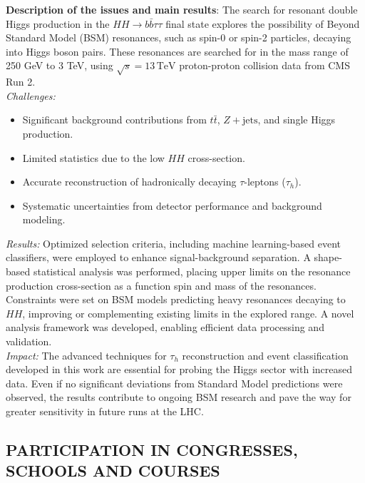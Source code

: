 \documentclass[12pt,a4paper,oneside]{extarticle}
\begin{document}
\noindent\textbf{Description of the issues and main results}:
The search for resonant double Higgs production in the $HH \to b\bar{b}\tau\tau$ final state explores the possibility of Beyond Standard Model (BSM) resonances, such as spin-0 or spin-2 particles, decaying into Higgs boson pairs. These resonances are searched for in the mass range of 250 GeV to 3 TeV, using $ \sqrt{s} = 13\,\textrm{TeV} $ proton-proton collision data from CMS Run 2.\\
\textit{Challenges:}
\begin{itemize}
    \item Significant background contributions from $t\bar{t}$, $Z + \textrm{jets}$, and single Higgs production.
    \item Limited statistics due to the low $HH$ cross-section.
    \item Accurate reconstruction of hadronically decaying $\tau$-leptons ($\tau_h$).
    \item Systematic uncertainties from detector performance and background modeling.
\end{itemize}
\noindent \textit{Results:}
Optimized selection criteria, including machine learning-based event classifiers, were employed to enhance signal-background separation. A shape-based statistical analysis was performed, placing upper limits on the resonance production cross-section as a function spin and mass of the resonances. Constraints were set on BSM models predicting heavy resonances decaying to $HH$, improving or complementing existing limits in the explored range. A novel analysis framework was developed, enabling efficient data processing and validation.\\
\textit{Impact:}
The advanced techniques for $\tau_h$ reconstruction and event classification developed in this work are essential for probing the Higgs sector with increased data. Even if no significant deviations from Standard Model predictions were observed, the results contribute to ongoing BSM research and pave the way for greater sensitivity in future runs at the LHC.

\subsection*{PARTICIPATION IN CONGRESSES, SCHOOLS AND COURSES}
\end{document}
